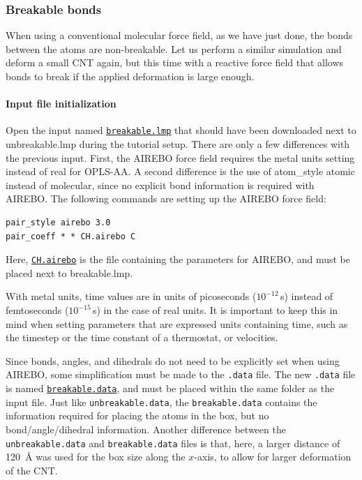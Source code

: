 \documentclass[9pt,tutorial]{livecoms}
\newcommand{\lmpcmd}[1]{\hspace{0pt}\colorbox{listing}{\textcolor{command}{\small{#1}}}\hspace{0pt}} %
\newcommand{\lmpcmdnote}[1]{\hspace{0pt}\colorbox{note_listing}{\textcolor{command}{\small{#1}}}\hspace{0pt}} %
\newcommand{\flecmd}[1]{\textcolor{command}{\texttt{#1}}} %
\newcommand{\dwlcmd}[1]{\textcolor{download}{\texttt{#1}}} %
\newcommand{\filepath}{https://raw.githubusercontent.com/lammpstutorials/lammpstutorials-article/main/files/}
\begin{document}
\subsubsection{Breakable bonds}

When using a conventional molecular force field, as we have just done,
the bonds between the atoms are non-breakable.  Let us perform a similar
simulation and deform a small CNT again, but this time with a reactive
force field that allows bonds to break if the applied deformation is
large enough.

\paragraph{Input file initialization}

Open the input named \href{\filepath tutorial2/breakable.lmp}{\dwlcmd{breakable.lmp}}
that should have been downloaded next to \lmpcmd{unbreakable.lmp} during
the tutorial setup.  There are only a few differences with the previous
input.  First, the AIREBO force field requires the \lmpcmd{metal} units
setting instead of \lmpcmd{real} for OPLS-AA.  A second difference is
the use of \lmpcmd{atom\_style atomic} instead of
\lmpcmd{molecular}, since no explicit bond information is required with
AIREBO.  The following commands are setting up the AIREBO force field:
\begin{lstlisting}
pair_style airebo 3.0
pair_coeff * * CH.airebo C
\end{lstlisting}
Here, \href{\filepath tutorial2/CH.airebo}{\dwlcmd{CH.airebo}} is the
file containing the parameters for AIREBO, and must be placed next to
\lmpcmd{breakable.lmp}.

\begin{note}
  With \lmpcmdnote{metal} units, time values are in units of picoseconds
  ($10^{-12}$\,s) instead of femtoseconds ($10^{-15}$\,s) in the case of
  \lmpcmdnote{real} units.  It is important to keep this in mind when
  setting parameters that are expressed units containing time, such as
  the timestep or the time constant of a thermostat, or velocities.
\end{note}

Since bonds, angles, and dihedrals do not need to be explicitly set when
using AIREBO, some simplification must be made to the \flecmd{.data}
file.  The new \flecmd{.data} file is named
%
\href{\filepath tutorial2/breakable.data}{\dwlcmd{breakable.data}},
%
and must be placed within the same folder as the input file.  Just like
\flecmd{unbreakable.data}, the \flecmd{breakable.data} contains the
information required for placing the atoms in the box, but no
bond/angle/dihedral information.  Another difference between the
\flecmd{unbreakable.data} and \flecmd{breakable.data} files is that,
here, a larger distance of 120~Å was used for the box size along
the $x$-axis, to allow for larger deformation of the CNT.
\end{document}
